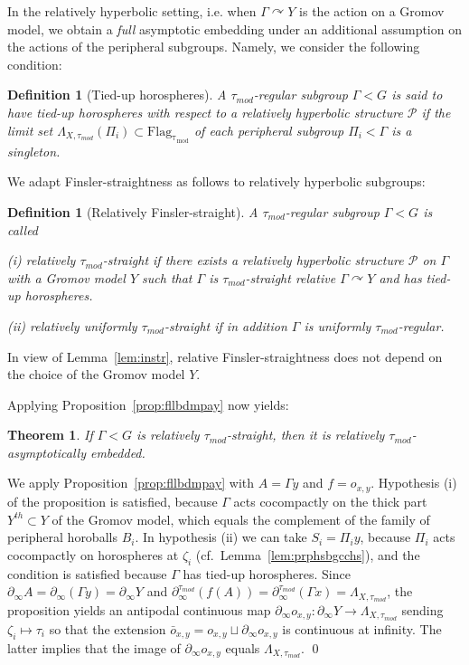 \documentclass[12pt]{article}
\theoremstyle{boldplain}
\newtheorem{thm}[equation]{Theorem}
\theoremstyle{bolddefinition}
\newtheorem{definition}[equation]{Definition}
\numberwithin{equation}{section}
\def\Ga{\Gamma}
\def\acts{\curvearrowright}
\def\Flagt{\operatorname{Flag_{\tau_{mod}}}}
\def\geo{\partial_{\infty}}
\def\geot{\partial_{\infty}^{\tau_{mod}}}
\def\LaXt{\Lambda_{X,\tau_{mod}}}
\def\taumod{\tau_{mod}}
\begin{document}
\medskip
In the relatively hyperbolic setting,
i.e. when $\Ga\acts Y$ is the action on a Gromov model, 
we obtain a {\em full} asymptotic embedding
under an additional assumption on the actions of the peripheral subgroups.
Namely, we consider the following condition:
\begin{definition}[Tied-up horospheres]
\label{def:tphrsphs}
A $\taumod$-regular subgroup $\Ga<G$ is said to have {\em tied-up horospheres}
with respect to a relatively hyperbolic structure ${\mathcal P}$ 
if the limit set $\LaXt(\Pi_i)\subset\Flagt$ of each peripheral subgroup $\Pi_i< \Ga$ is a singleton. 
\end{definition}

We adapt Finsler-straightness as follows to relatively hyperbolic subgroups:
\begin{definition}[Relatively Finsler-straight]
A $\taumod$-regular subgroup $\Ga<G$ is called 

(i) {\em relatively $\taumod$-straight}
if there exists a relatively hyperbolic structure ${\mathcal P}$ on $\Ga$ with a Gromov model $Y$
such that $\Ga$ is {\em $\taumod$-straight} relative $\Ga\acts Y$
and has tied-up horospheres.

(ii) {\em relatively uniformly $\taumod$-straight} if in addition $\Ga$ is uniformly $\taumod$-regular.
\end{definition} 

In view of Lemma~\ref{lem:instr},
relative Finsler-straightness does not depend on the choice of the Gromov model $Y$.

Applying Proposition~\ref{prop:fllbdmpay} now yields: 
\begin{thm}
\label{thm:str-ae}
If $\Ga<G$ is relatively $\taumod$-straight,
then it is relatively $\taumod$-asymptotically embedded. 
\end{thm}
\proof
We apply Proposition~\ref{prop:fllbdmpay} with $A=\Ga y$ and $f=o_{x,y}$.
Hypothesis (i) of the proposition is satisfied, 
because $\Ga$ acts cocompactly on the thick part $Y^{th}\subset Y$ of the Gromov model,
which equals the complement of the family of peripheral horoballs $B_i$.
In hypothesis (ii) we can take $S_i=\Pi_i y$,
because $\Pi_i$ acts cocompactly on horospheres at $\zeta_i$ (cf.\ Lemma~\ref{lem:prphsbgcchs}),
and the condition is satisfied because $\Ga$ has tied-up horospheres.
Since $\geo A=\geo(\Ga y)=\geo Y$ and $\geot(f(A))=\geot(\Ga x)=\LaXt$, 
the proposition yields an antipodal continuous map $\geo o_{x,y}:\geo Y\to\LaXt$ sending $\zeta_i\mapsto\tau_i$
so that the extension $\bar o_{x,y}=o_{x,y}\sqcup\geo o_{x,y}$ is continuous at infinity.
The latter implies that the image of $\geo o_{x,y}$ equals $\LaXt$.
\qed
\end{document}
